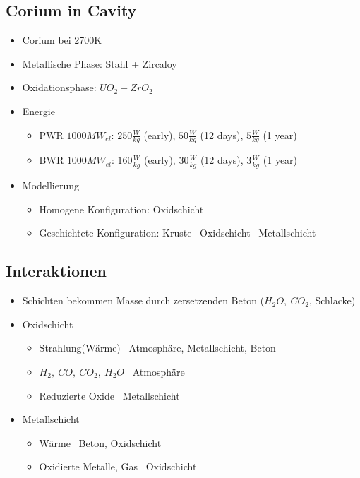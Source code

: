 \documentclass[12pt]{article}
\begin{document}
\subsection{Corium in Cavity}
\begin{itemize}[noitemsep]
	\item Corium bei 2700K
	\item Metallische Phase: Stahl + Zircaloy
	\item Oxidationsphase: \(UO_2 + ZrO_2\)
	\item Energie
		\begin{itemize}[noitemsep]
			\item PWR \(1000MW_{el}\): \(250\frac{W}{kg}\) (early), \(50\frac{W}{kg}\) (12 days), \(5\frac{W}{kg}\) (1 year)
			\item BWR \(1000MW_{el}\): \(160\frac{W}{kg}\) (early), \(30\frac{W}{kg}\) (12 days), \(3\frac{W}{kg}\) (1 year)
		\end{itemize}
	\item Modellierung
		\begin{itemize}[noitemsep]
			\item Homogene Konfiguration: Oxidschicht
			\item Geschichtete Konfiguration: Kruste \textrightarrow\ Oxidschicht \textrightarrow\ Metallschicht
		\end{itemize}
\end{itemize}

\subsection{Interaktionen}
\begin{itemize}[noitemsep]
	\item Schichten bekommen Masse durch zersetzenden Beton (\(H_2O,\ CO_2\), Schlacke)
	\item Oxidschicht
		\begin{itemize}[noitemsep]
			\item Strahlung(Wärme) \textrightarrow\ Atmosphäre, Metallschicht, Beton
			\item \(H_2,\ CO,\ CO_2,\ H_2O\) \textrightarrow\ Atmosphäre
			\item Reduzierte Oxide \textrightarrow\ Metallschicht
		\end{itemize}
	\item Metallschicht
		\begin{itemize}[noitemsep]
			\item Wärme \textrightarrow\ Beton, Oxidschicht
			\item Oxidierte Metalle, Gas \textrightarrow\ Oxidschicht
		\end{itemize}
\end{itemize}
\end{document}
